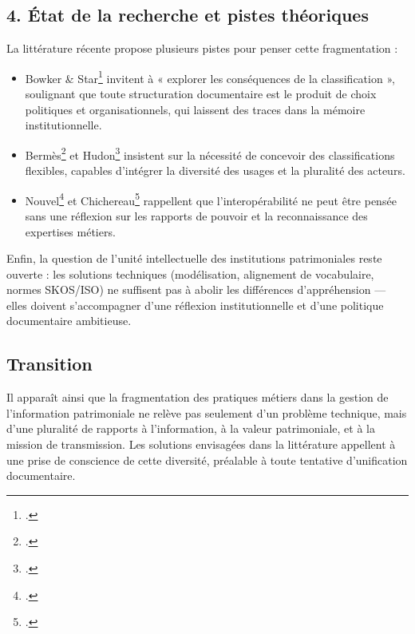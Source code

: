 \subsection*{4. État de la recherche et pistes théoriques}

La littérature récente propose plusieurs pistes pour penser cette fragmentation :
\begin{itemize}
	\item Bowker \& Star\footcite{bowkerArrangerChosesConsequences2023} invitent à « explorer les conséquences de la classification », soulignant que toute structuration documentaire est le produit de choix politiques et organisationnels, qui laissent des traces dans la mémoire institutionnelle.
	\item Bermès\footcite{bermesVersNouveauxCatalogues2016} et Hudon\footcite{hudonISO25964Pour2012a} insistent sur la nécessité de concevoir des classifications flexibles, capables d’intégrer la diversité des usages et la pluralité des acteurs.
	\item Nouvel\footcite{nouvelOutilsDindexationBibliothecaires2022} et Chichereau\footcite{chichereauNormesConceptionGestion2007} rappellent que l’interopérabilité ne peut être pensée sans une réflexion sur les rapports de pouvoir et la reconnaissance des expertises métiers.
\end{itemize}

Enfin, la question de l’unité intellectuelle des institutions patrimoniales reste ouverte : les solutions techniques (modélisation, alignement de vocabulaire, normes SKOS/ISO) ne suffisent pas à abolir les différences d’appréhension — elles doivent s’accompagner d’une réflexion institutionnelle et d’une politique documentaire ambitieuse.

\subsection*{Transition}

Il apparaît ainsi que la fragmentation des pratiques métiers dans la gestion de l’information patrimoniale ne relève pas seulement d’un problème technique, mais d’une pluralité de rapports à l’information, à la valeur patrimoniale, et à la mission de transmission. Les solutions envisagées dans la littérature appellent à une prise de conscience de cette diversité, préalable à toute tentative d’unification documentaire.